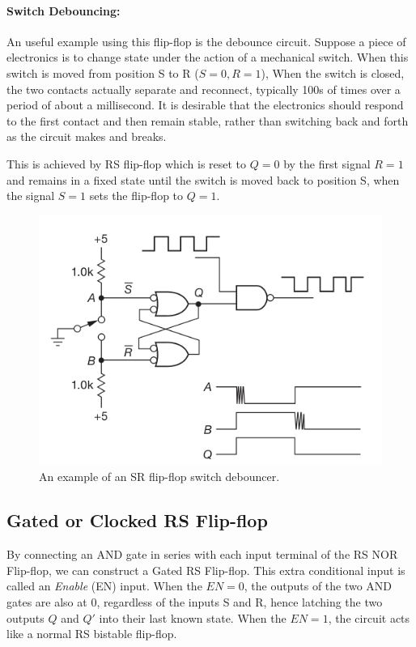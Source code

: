 \paragraph*{\textbf{Switch Debouncing:}}
An useful example using this flip-flop is the debounce circuit. Suppose a
piece of electronics is to change state under the action of a mechanical switch. When this
switch is moved from position S to R ($S=0, R=1$), When the switch is closed, the two contacts actually separate and reconnect, typically 100s of times over a period of about a millisecond. It is desirable that the electronics should respond to the first contact and then remain stable, rather than switching back and forth as the circuit makes and breaks. 

This is achieved by RS flip-flop which is reset to $Q=0$ by the first signal $R=1$ and remains in a fixed state until the switch is moved back to position S, when the signal $S=1$ sets the flip-flop to $Q=1$.

\begin{figure}[H]
    \centering
    \includegraphics[width=0.80\columnwidth]{images/debounce.png}
    \caption{An example of an SR flip-flop switch debouncer.}
\end{figure}

\subsection*{Gated or Clocked RS Flip-flop}
By connecting an AND gate in series with each input terminal of the RS NOR Flip-flop, we can construct a Gated RS Flip-flop. This extra conditional input is called an \textit{Enable} (EN) input.
When the $EN = 0$, the outputs of the two AND gates are also at 0, regardless of the inputs S and R, hence latching the two outputs $Q$ and $Q'$ into their last known state. When the $EN = 1$, the circuit acts like a normal RS bistable
flip-flop.


